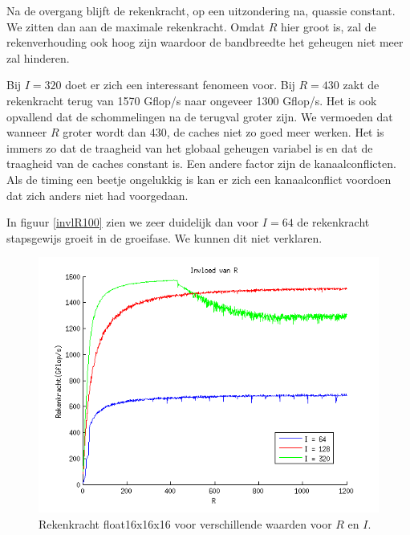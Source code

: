 Na de overgang blijft de rekenkracht, op een uitzondering na, quassie constant. We zitten dan aan de maximale rekenkracht. Omdat $R$ hier groot is, zal de rekenverhouding ook hoog zijn waardoor de bandbreedte het geheugen niet meer zal hinderen. 

Bij $I=320$ doet er zich een interessant fenomeen voor. Bij $R=430$ zakt de rekenkracht terug van 1570 Gflop/s naar ongeveer 1300 Gflop/s. Het is ook opvallend dat de schommelingen na de terugval groter zijn. We vermoeden dat wanneer $R$ groter wordt dan 430, de caches niet zo goed meer werken. Het is immers zo dat de traagheid van het globaal geheugen variabel is en dat de traagheid van de caches constant is. Een andere factor zijn de kanaalconflicten. Als de timing een beetje ongelukkig is kan er zich een kanaalconflict voordoen dat zich anders niet had voorgedaan.

In figuur \ref{invlR100} zien we zeer duidelijk dan voor $I = 64$ de rekenkracht stapsgewijs groeit in de groeifase. We kunnen dit niet verklaren.

\begin{figure}
\centering
\includegraphics{invlR1200}
\caption{\label{invlR1200}Rekenkracht float16x16x16 voor verschillende waarden voor $R$ en $I$.}
\end{figure}

